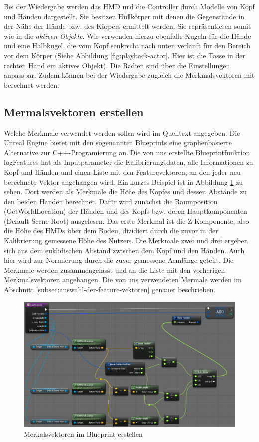 Bei der Wiedergabe werden das HMD und die Controller durch Modelle von Kopf und Händen dargestellt. Sie besitzen Hüllkörper mit denen die Gegenstände in der Nähe der Hände bzw. des Körpers ermittelt werden. Sie repräsentieren somit wie in \cite{scene-grok} die \textit{aktiven Objekte}. Wir verwenden hierzu ebenfalls Kugeln für die Hände und eine Halbkugel, die vom Kopf senkrecht nach unten verläuft für den Bereich vor dem Körper (Siehe Abbildung \ref{fig:playback-actor}. Hier ist die Tasse in der rechten Hand ein aktives Objekt). Die Radien sind über die Einstellungen anpassbar. Zudem können bei der Wiedergabe zugleich die Merkmalsvektoren mit berechnet werden.

\subsection{Mermalsvektoren erstellen}
\label{subsec:merkmalsvektoren-erstellen}
Welche Merkmale verwendet werden sollen wird im Quelltext angegeben. Die Unreal Engine bietet mit den sogenannten Blueprints eine graphenbasierte Alternative zur C++-Programierung an. Die von uns erstellte Blueprintfunktion \glqq{}logFeatures\grqq{} hat als Inputparameter die Kalibrierungsdaten, alle Informationen zu Kopf und Händen und einen Liste mit den Featurevektoren, an den jeder neu berechnete Vektor angehangen wird. Ein kurzes Beispiel ist in Abbildung \ref{fig:log-features} zu sehen. Dort werden als Merkmale die Höhe des Kopfes und dessen Abstände zu den beiden Händen berechnet. Dafür wird zunächst die Raumposition (\glqq{}GetWorldLocation\grqq{}) der Händen und des Kopfs bzw. deren Hauptkomponenten (\glqq{}Default Scene Root\grqq{}) ausgelesen. Das erste Merkmal ist die Z-Komponente, also die Höhe des HMDs über dem Boden, dividiert durch die zuvor in der Kalibrierung gemessene Höhe des Nutzers. Die Merkmale zwei und drei ergeben sich aus dem euklidischen Abstand zwischen dem Kopf und den Händen. Auch hier wird zur Normierung durch die zuvor gemessene Armlänge geteilt. Die Merkmale werden zusammengefasst und an die Liste mit den vorherigen Merkmalsvektoren angehangen. Die von uns verwendeten Mermale werden im Abschnitt \ref{subsec:auswahl-der-feature-vektoren} genauer beschrieben.
\begin{figure}[hbtp]
\includegraphics[width=1.0\linewidth]{LogFeatures.png}
\caption{Merkalsvektoren im Blueprint erstellen}
\label{fig:log-features}
\end{figure}

